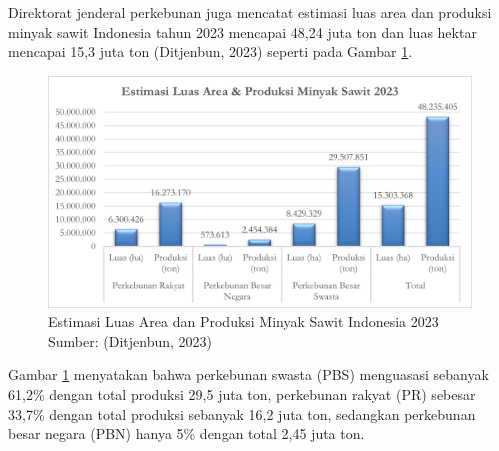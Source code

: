 Direktorat jenderal perkebunan juga mencatat estimasi luas area dan produksi minyak sawit Indonesia tahun 2023 mencapai 48,24 juta ton dan luas hektar mencapai 15,3 juta ton (Ditjenbun, 2023) seperti pada Gambar  \ref{img:bab1-Estimasi-Luas-Area-Produksi-Minyak}.

\begin{figure}[H]
	\vspace{-0.1cm}
	\begin{center}
		\includegraphics[width=1\columnwidth]{bab1/Gambar/Picture4.png}
	\end{center}
	\vspace{-0.2cm}
	\caption{Estimasi Luas Area dan Produksi Minyak Sawit Indonesia 2023\\Sumber: (Ditjenbun, 2023)}\label{img:bab1-Estimasi-Luas-Area-Produksi-Minyak}
\end{figure}

Gambar \ref{img:bab1-Estimasi-Luas-Area-Produksi-Minyak} menyatakan bahwa perkebunan swasta (PBS) menguasasi sebanyak 61,2\% dengan total produksi 29,5 juta ton, perkebunan rakyat (PR) sebesar 33,7\% dengan total produksi sebanyak 16,2 juta ton, sedangkan perkebunan besar negara (PBN) hanya 5\% dengan total 2,45 juta ton. 

